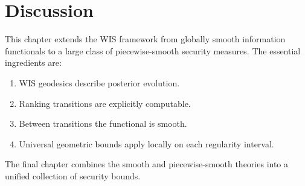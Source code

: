 \section{Discussion}\label{ch:sec:discussion-piecewise_smooth}
This chapter extends the WIS framework from globally smooth information
functionals to a large class of piecewise-smooth security measures.
The essential ingredients are:
\begin{enumerate}
\item WIS geodesics describe posterior evolution.
\item Ranking transitions are explicitly computable.
\item Between transitions the functional is smooth.
\item Universal geometric bounds apply locally on each regularity
    interval.
\end{enumerate}
The final chapter combines the smooth and piecewise-smooth theories into
a unified collection of security bounds.

